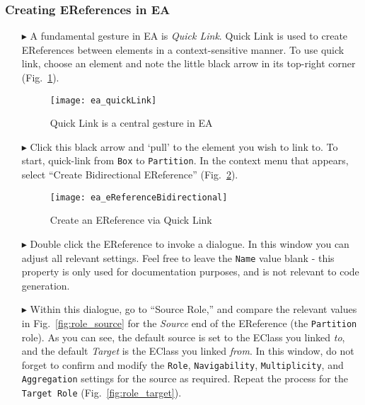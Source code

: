 \newpage
\subsubsection{Creating EReferences in EA}
\visHeader
\hypertarget{static:references vis}{}

\begin{itemize}

\item[$\blacktriangleright$] A fundamental gesture in EA is \emph{Quick Link}. Quick Link is used to create EReferences between elements in a context-sensitive
manner. To use quick link, choose an element and note the little black arrow in its top-right corner (Fig.~\ref{fig:quicklink}).

\begin{figure}[htbp]
	\centering
  \texttt{[image: ea\_quickLink]}
	\caption{Quick Link is a central gesture in EA}
	\label{fig:quicklink}
\end{figure}
\FloatBarrier

\item[$\blacktriangleright$] Click this black arrow and `pull' to the element you wish to link to. To start, quick-link from \texttt{Box} to \texttt{Partition}.
In the context menu that appears, select ``Create Bidirectional EReference'' (Fig.~\ref{fig:ereference}).

\begin{figure}[htbp]
	\centering
  \texttt{[image: ea\_eReferenceBidirectional]}
	\caption{Create an EReference via Quick Link}
	\label{fig:ereference}
\end{figure}
\FloatBarrier

\item[$\blacktriangleright$] Double click the EReference to invoke a dialogue. In this window you can adjust all relevant settings. Feel free to leave the
\texttt{Name} value blank - this property is only used for documentation purposes, and is not relevant to code generation.

\item[$\blacktriangleright$] Within this dialogue, go to ``Source Role,'' and compare the relevant values in Fig.~\ref{fig:role_source} for the \emph{Source}
end of the EReference (the \texttt{Partition} role). As you can see, the default source is set to the EClass you linked \emph{to}, and the default \emph{Target}
is the EClass you linked \emph{from}. In this window, do not forget to confirm and modify the \texttt{Role}, \texttt{Navigability}, \texttt{Multiplicity}, and
\texttt{Aggregation} settings for the source as required. Repeat the process for the \texttt{Target Role} (Fig.~\ref{fig:role_target}).


\end{itemize}

